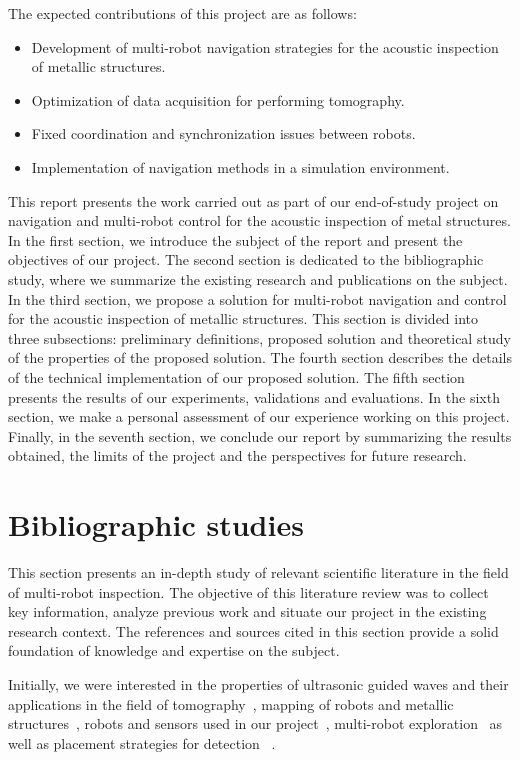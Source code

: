 \documentclass[english,RandD]{rapportPFE}  %
\begin{document}
		The expected contributions of this project are as follows:
		\begin{itemize}
			\item Development of multi-robot navigation strategies for the acoustic inspection of metallic structures.
			\item Optimization of data acquisition for performing tomography.
			\item Fixed coordination and synchronization issues between robots.
			\item Implementation of navigation methods in a simulation environment.
		\end{itemize}

		This report presents the work carried out as part of our end-of-study project on navigation and multi-robot control for the acoustic inspection of metal structures.
		In the first section, we introduce the subject of the report and present the objectives of our project.
		The second section is dedicated to the bibliographic study, where we summarize the existing research and publications on the subject.
		In the third section, we propose a solution for multi-robot navigation and control for the acoustic inspection of metallic structures.
		This section is divided into three subsections: preliminary definitions, proposed solution and theoretical study of the properties of the proposed solution.
		The fourth section describes the details of the technical implementation of our proposed solution.
		The fifth section presents the results of our experiments, validations and evaluations.
		In the sixth section, we make a personal assessment of our experience working on this project.
		Finally, in the seventh section, we conclude our report by summarizing the results obtained, the limits of the project and the perspectives for future research.
	\section{Bibliographic studies}
		This section presents an in-depth study of relevant scientific literature in the field of multi-robot inspection.
		The objective of this literature review was to collect key information, analyze previous work and situate our project in the existing research context.
		The references and sources cited in this section provide a solid foundation of knowledge and expertise on the subject.

		Initially, we were interested in the properties of ultrasonic guided waves and their applications in the field of tomography~\cite{OUABI2022106705, HUTHWAITE2013979}, mapping of robots and metallic structures~\cite{9364359, 9811581 , inventions3030059, 9568841}, robots and sensors used in our project~\cite{s22093235}, multi-robot exploration~\cite{bautin:hal-00757960, articlesvsdf} as well as placement strategies for detection ~\cite{article455556, 7487624, 7139673}.
\end{document}
